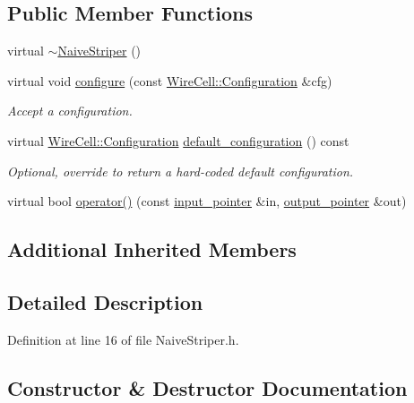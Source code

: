 \subsection*{Public Member Functions}
\begin{DoxyCompactItemize}
\item 
virtual \hyperlink{class_wire_cell_1_1_img_1_1_naive_striper_a2ae961f6ae866ee0d550a0b92fa3d5ba}{$\sim$\+Naive\+Striper} ()
\item 
virtual void \hyperlink{class_wire_cell_1_1_img_1_1_naive_striper_ad71a8917383f9efbb9d963a5a6535160}{configure} (const \hyperlink{namespace_wire_cell_a9f705541fc1d46c608b3d32c182333ee}{Wire\+Cell\+::\+Configuration} \&cfg)
\begin{DoxyCompactList}\small\item\em Accept a configuration. \end{DoxyCompactList}\item 
virtual \hyperlink{namespace_wire_cell_a9f705541fc1d46c608b3d32c182333ee}{Wire\+Cell\+::\+Configuration} \hyperlink{class_wire_cell_1_1_img_1_1_naive_striper_abec6eadf74638aa14d86442bc23e2a7a}{default\+\_\+configuration} () const
\begin{DoxyCompactList}\small\item\em Optional, override to return a hard-\/coded default configuration. \end{DoxyCompactList}\item 
virtual bool \hyperlink{class_wire_cell_1_1_img_1_1_naive_striper_a568d56d13dbba3a4351f0ef9f2df43f3}{operator()} (const \hyperlink{class_wire_cell_1_1_i_function_node_a55c0946156df9b712b8ad1a0b59b2db6}{input\+\_\+pointer} \&in, \hyperlink{class_wire_cell_1_1_i_function_node_afc02f1ec60d31aacddf64963f9ca650b}{output\+\_\+pointer} \&out)
\end{DoxyCompactItemize}
\subsection*{Additional Inherited Members}


\subsection{Detailed Description}


Definition at line 16 of file Naive\+Striper.\+h.



\subsection{Constructor \& Destructor Documentation}
\mbox{\label{class_wire_cell_1_1_img_1_1_naive_striper_a2ae961f6ae866ee0d550a0b92fa3d5ba}} 
